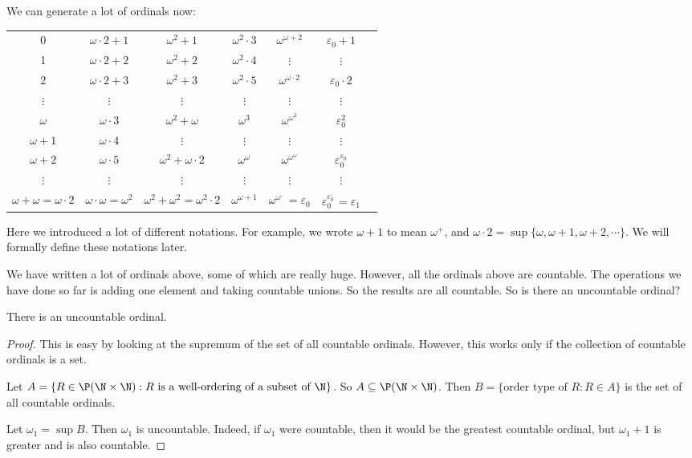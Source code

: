 \documentclass[a4paper]{article}
\begin{document}
We can generate a lot of ordinals now:
\begin{center}
  \begin{tabular}{ccccccc}
    0 & $\omega\cdot 2 + 1$ & $\omega^2 + 1$ & $\omega^2\cdot 3$ & $\omega^{\omega + 2}$ & $\varepsilon_0 + 1$ \\
    1 & $\omega\cdot 2 + 2$ & $\omega^2 + 2$ & $\omega^2\cdot 4$ & $\vdots$ & $\vdots$ \\
    2 & $\omega\cdot 2 + 3$ & $\omega^2 + 3$ & $\omega^2\cdot 5$ & $\omega^{\omega \cdot 2}$ & $\varepsilon_0 \cdot 2$ \\
    $\vdots$ & $\vdots$ & $\vdots$ & $\vdots$ & $\vdots$ & $\vdots$ \\
    $\omega$ & $\omega\cdot 3$ & $\omega^2 + \omega$ & $\omega^3$ & $\omega^{\omega^2}$ & $\varepsilon_0^2$ \\
    $\omega + 1$ & $\omega\cdot 4$ & $\vdots$ & $\vdots$ & $\vdots$ & $\vdots$ \\
    $\omega + 2$ & $\omega\cdot 5$ & $\omega^2 + \omega \cdot 2$ & $\omega^\omega$ & $\omega^{\omega^{\omega}}$ & $\varepsilon_0^{\varepsilon_0}$ \\
    $\vdots$ & $\vdots$ & $\vdots$ & $\vdots$ & $\vdots$ & $\vdots$ \\
    $\omega + \omega = \omega\cdot 2$ & $\omega\cdot \omega = \omega^2$ & $\omega^2 + \omega^2 = \omega^2 \cdot 2$ & $\omega^{\omega + 1}$ & $\omega^{\omega^{.^{.^.}}} = \varepsilon_0$ & $\varepsilon_0^{\varepsilon_0^{.^{.^.}}} = \varepsilon_1$ \\
  \end{tabular}
\end{center}
Here we introduced a lot of different notations. For example, we wrote $\omega + 1$ to mean $\omega^+$, and $\omega\cdot 2 = \sup\{\omega, \omega + 1, \omega + 2, \cdots\}$. We will formally define these notations later.

We have written a lot of ordinals above, some of which are really huge. However, all the ordinals above are countable. The operations we have done so far is adding one element and taking countable unions. So the results are all countable. So is there an uncountable ordinal?

\begin{thm}
  There is an uncountable ordinal.
\end{thm}

\begin{proof}
  This is easy by looking at the supremum of the set of all countable ordinals. However, this works only if the collection of countable ordinals is a set.

  Let $A = \{R\in \P(\N\times \N): R \text{ is a well-ordering of a subset of }\N\}$. So $A \subseteq \P(\N\times \N)$. Then $B = \{\text{order type of }R: R\in A\}$ is the set of all countable ordinals.

  Let $\omega_1 = \sup B$. Then $\omega_1$ is uncountable. Indeed, if $\omega_1$ were countable, then it would be the greatest countable ordinal, but $\omega_1 + 1$ is greater and is also countable.
\end{proof}
\end{document}
